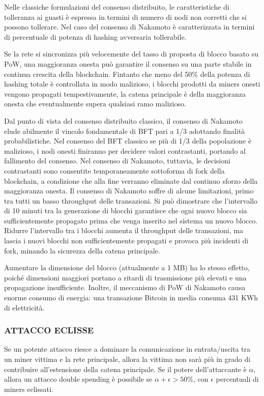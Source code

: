 \vspace{5mm}

Nelle classiche formulazioni del consenso distribuito, le caratteristiche di tolleranza ai guasti è espressa in termini di numero di nodi non corretti che si possono tollerare. Nel caso del consenso di Nakamoto è caratterizzata in termini di percentuale di potenza di hashing avversaria tollerabile.

Se la rete si sincronizza più velocemente del tasso di proposta di blocco basato su PoW, una maggioranza onesta può garantire il consenso su una parte stabile in continua crescita della blockchain. Fintanto che meno del 50\% della potenza di hashing totale è controllata in modo malizioso, i blocchi prodotti da miners onesti vengono propagati tempestivamente, la catena principale è della maggioranza onesta che eventualmente supera qualsiasi ramo malizioso.

Dal punto di vista del consenso distribuito classico, il consenso di Nakamoto elude abilmente il vincolo fondamentale di BFT pari a 1/3 adottando finalità probabilistiche. Nel consenso del BFT classico se più di 1/3 della popolazione è malizioso, i nodi onesti finiranno per decidere valori contrastanti, portando al fallimento del consenso. Nel consenso di Nakamoto, tuttavia, le decisioni contrastanti sono consentite temporaneamente sottoforma di fork della blockchain, a condizione che alla fine verranno eliminate dal continuo sforzo della maggioranza onesta.
Il consenso di Nakamoto soffre di alcune limitazioni, primo tra tutti un basso throughput delle transazioni. Si può dimostrare che l'intervallo di 10 minuti tra la generazione di blocchi garantisce che ogni nuovo blocco sia sufficientemente propagato prima che venga inserito nel sistema un nuovo blocco. Ridurre l'intervallo tra i blocchi aumenta il throughput delle transazioni, ma lascia i nuovi blocchi non sufficientemente propagati e provoca più incidenti di fork, minando la sicurezza della catena principale.

Aumentare la dimensione del blocco (attualmente a 1 MB) ha lo stesso effetto, poiché dimensioni maggiori portano a ritardi di trasmissione più elevati e una propagazione insufficiente. Inoltre, il meccanismo di PoW di Nakamoto causa enorme consumo di energia: una transazione Bitcoin in media consuma 431 KWh di elettricità.

\subsubsection{\textbf{ATTACCO ECLISSE}}
Se un potente attacco riesce a dominare la comunicazione in entrata/uscita tra un miner vittima e la rete principale, allora  la vittima non sarà più in grado di contribuire all'estensione della catena principale. Se il potere dell'attaccante è $\alpha$, allora un attacco double spending è possibile se $\alpha + \epsilon > 50\%$, con $\epsilon$ percentuali di miners eclissati.

